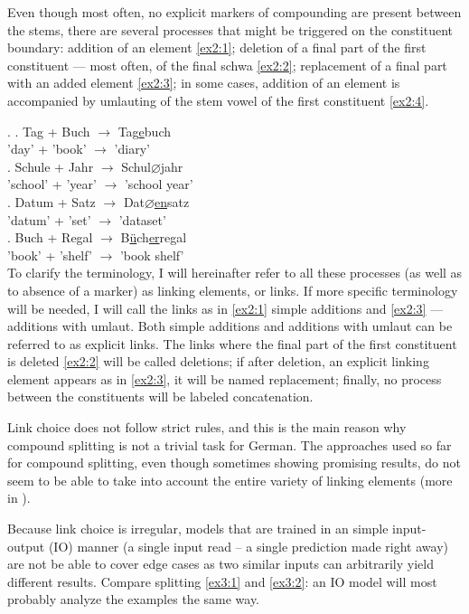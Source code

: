 \documentclass[11pt]{article}
\begin{document}
Even though most often, no explicit markers of compounding are present between the stems, there are several processes that might be triggered on the constituent boundary: addition of an element \ref{ex2:1}; deletion of a final part of the first constituent --- most often, of the final schwa \ref{ex2:2}; replacement of a final part with an added element \ref{ex2:3}; in some cases, addition of an element is accompanied by umlauting of the stem vowel of the first constituent \ref{ex2:4}.

\ex.
\ag. \label{ex2:1}Tag + Buch {$\rightarrow$} Tag\underline{e}buch \\
'day' + 'book' {$\rightarrow$} 'diary' \\
\bg. \label{ex2:2}Schule + Jahr {$\rightarrow$} Schul\underline{$\varnothing$}jahr \\
'school' + 'year' {$\rightarrow$} {'school year'} \\
\cg. \label{ex2:3}Datum + Satz {$\rightarrow$} Dat\underline{$\varnothing$en}satz \\
'datum' + 'set' {$\rightarrow$} 'dataset' \\
\dg. \label{ex2:4}Buch + Regal {$\rightarrow$} B\underline{{\"u}}ch\underline{er}regal \\
'book' + 'shelf' {$\rightarrow$} {'book shelf'} \\

To clarify the terminology, I will hereinafter refer to all these processes (as well as to absence of a marker) as linking elements, or links. If more specific terminology will be needed, I will call the links as in \ref{ex2:1} simple additions and \ref{ex2:3} --- additions with umlaut. Both simple additions and additions with umlaut can be referred to as explicit links. The links where the final part of the first constituent is deleted \ref{ex2:2} will be called deletions; if after deletion, an explicit linking element appears as in \ref{ex2:3}, it will be named replacement; finally, no process between the constituents will be labeled concatenation.

Link choice does not follow strict rules, and this is the main reason why compound splitting is not a trivial task for German. The approaches used so far for compound splitting, even though sometimes showing promising results, do not seem to be able to take into account the entire variety of linking elements (more in ).

Because link choice is irregular, models that are trained in an simple input-output (IO) manner (a single input read -- a single prediction made right away) are not be able to cover edge cases as two similar inputs can arbitrarily yield different results. Compare splitting \ref{ex3:1} and \ref{ex3:2}: an IO model will most probably analyze the examples the same way. 
\end{document}
